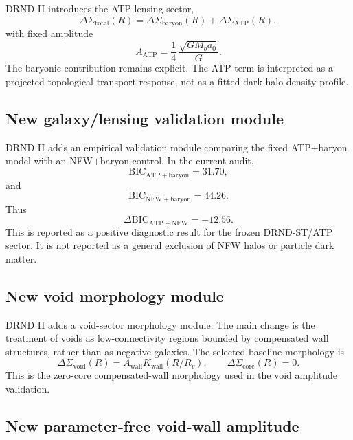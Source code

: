 \documentclass[12pt]{iopart}
\begin{document}
DRND II introduces the ATP lensing sector,
\begin{equation}
\Delta\Sigma_{\mathrm{total}}(R)
=
\Delta\Sigma_{\mathrm{baryon}}(R)
+
\Delta\Sigma_{\mathrm{ATP}}(R),
\end{equation}
with fixed amplitude
\begin{equation}
A_{\mathrm{ATP}}
=
\frac14\,\frac{\sqrt{GM_ba_0}}{G}.
\end{equation}
The baryonic contribution remains explicit. The ATP term is interpreted as a projected topological transport response, not as a fitted dark-halo density profile.

\subsection{New galaxy/lensing validation module}

DRND II adds an empirical validation module comparing the fixed ATP+baryon model with an NFW+baryon control. In the current audit,
\begin{equation}
\mathrm{BIC}_{\mathrm{ATP+baryon}}=31.70,
\end{equation}
and
\begin{equation}
\mathrm{BIC}_{\mathrm{NFW+baryon}}=44.26.
\end{equation}
Thus
\begin{equation}
\Delta\mathrm{BIC}_{\mathrm{ATP-NFW}}
=
-12.56.
\end{equation}
This is reported as a positive diagnostic result for the frozen DRND-ST/ATP sector. It is not reported as a general exclusion of NFW halos or particle dark matter.

\subsection{New void morphology module}

DRND II adds a void-sector morphology module. The main change is the treatment of voids as low-connectivity regions bounded by compensated wall structures, rather than as negative galaxies. The selected baseline morphology is
\begin{equation}
\Delta\Sigma_{\mathrm{void}}(R)
=
A_{\mathrm{wall}}K_{\mathrm{wall}}(R/R_v),
\qquad
\Delta\Sigma_{\mathrm{core}}(R)=0.
\end{equation}
This is the zero-core compensated-wall morphology used in the void amplitude validation.

\subsection{New parameter-free void-wall amplitude}
\end{document}
